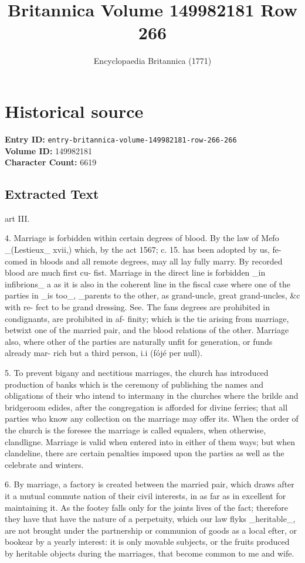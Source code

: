 \documentclass{article}
\title{Britannica Volume 149982181 Row 266}
\date{Encyclopaedia Britannica (1771)}
\begin{document}
\maketitle

\section*{Historical source}
\textbf{Entry ID:} \texttt{entry-britannica-volume-149982181-row-266-266} \\
\textbf{Volume ID:} 149982181 \\
\textbf{Character Count:} 6619

\subsection*{Extracted Text}
art III.

4. Marriage is forbidden within certain degrees of blood. By the law of Mefo \_(Lestieux\_ xvii,) which, by the act 1567; c. 15. has been adopted by us, fe- comed in bloods and all remote degrees, may all lay fully marry. By recorded blood are much first cu- fist. Marriage in the direct line is forbidden \_in infibrions\_ a as it is also in the coherent line in the fiscal case where one of the parties in \_is too\_, \_parents to the other, as grand-uncle, great grand-uncles, \&c with re- fect to be grand dressing. See. The fans degrees are prohibited in condignants, are prohibited in af- finity; which is the tie arising from marriage, betwixt one of the married pair, and the blood relations of the other. Marriage also, where other of the parties are naturally unfit for generation, or funds already mar- rich but a third person, i.i (fójé per null).

5. To prevent bigany and nectitious marriages, the church has introduced production of banks which is the ceremony of publishing the names and obligations of their who intend to intermany in the churches where the brilde and bridgeroom edides, after the congregation is afforded for divine ferries; that all parties who know any collection on the marriage may offer its. When the order of the church is the foresee the marriage is called equalers, when otherwise, clandligne. Marriage is valid when entered into in either of them ways; but when clandeline, there are certain penalties imposed upon the parties as well as the celebrate and winters.

6. By marriage, a factory is created between the married pair, which draws after it a mutual commute nation of their civil interests, in as far as in excellent for maintaining it. As the footey falls only for the joints lives of the fact; therefore they have that have the nature of a perpetuity, which our law flyks \_heritable\_, are not brought under the partnership or communion of goods as a local efter, or bookear by a yearly interest: it is only movable subjects, or the fruits produced by heritable objects during the marriages, that become common to me and wife.
\end{document}
